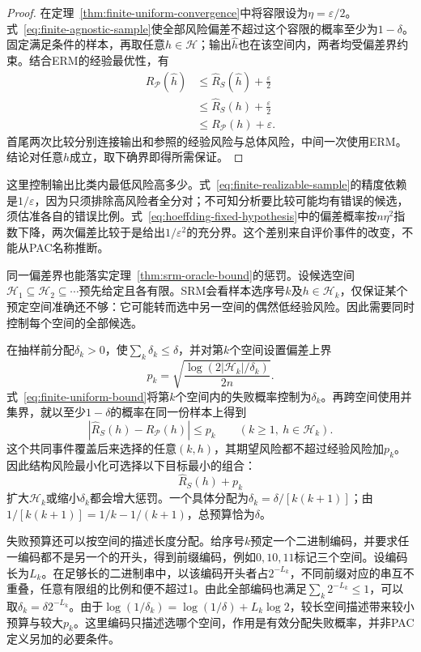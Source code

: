 \begin{proof}
在定理~\ref{thm:finite-uniform-convergence}中将容限设为$\eta=\varepsilon/2$。式~\eqref{eq:finite-agnostic-sample}使全部风险偏差不超过这个容限的概率至少为$1-\delta$。固定满足条件的样本，再取任意$h\in\mathcal H$；输出$\hat h$也在该空间内，两者均受偏差界约束。结合ERM的经验最优性，有
\begin{align*}
 R_{\mathcal P}(\hat h)
 &\leq\hat R_S(\hat h)+\frac{\varepsilon}{2}\\
 &\leq\hat R_S(h)+\frac{\varepsilon}{2}\\
 &\leq R_{\mathcal P}(h)+\varepsilon.
\end{align*}
首尾两次比较分别连接输出和参照的经验风险与总体风险，中间一次使用ERM。结论对任意$h$成立，取下确界即得所需保证。
\end{proof}

这里控制输出比类内最低风险高多少。式~\eqref{eq:finite-realizable-sample}的精度依赖是$1/\varepsilon$，因为只须排除高风险者全分对；不可知分析要比较可能均有错误的候选，须估准各自的错误比例。式~\eqref{eq:hoeffding-fixed-hypothesis}中的偏差概率按$n\eta^2$指数下降，两次偏差比较于是给出$1/\varepsilon^2$的充分界。这个差别来自评价事件的改变，不能从PAC名称推断。

同一偏差界也能落实定理~\ref{thm:srm-oracle-bound}的惩罚。设候选空间$\mathcal H_1\subseteq\mathcal H_2\subseteq\cdots$预先给定且各有限。SRM会看样本选序号$k$及$h\in\mathcal H_k$，仅保证某个预定空间准确还不够：它可能转而选中另一空间的偶然低经验风险。因此需要同时控制每个空间的全部候选。

在抽样前分配$\delta_k>0$，使$\sum_k\delta_k\leq\delta$，并对第$k$个空间设置偏差上界
\[
 p_k=\sqrt{\frac{\log(2|\mathcal H_k|/\delta_k)}{2n}}.
\]
式~\eqref{eq:finite-uniform-bound}将第$k$个空间内的失败概率控制为$\delta_k$。再跨空间使用并集界，就以至少$1-\delta$的概率在同一份样本上得到
\[
 |\hat R_S(h)-R_{\mathcal P}(h)|\leq p_k
 \qquad(k\geq1,\ h\in\mathcal H_k).
\]
这个共同事件覆盖后来选择的任意$(k,h)$，其期望风险都不超过经验风险加$p_k$。因此结构风险最小化可选择以下目标最小的组合：
\begin{equation}
 \hat R_S(h)+p_k
 \label{eq:srm-finite-penalty}
\end{equation}
扩大$\mathcal H_k$或缩小$\delta_k$都会增大惩罚。一个具体分配为$\delta_k=\delta/[k(k+1)]$；由$1/[k(k+1)]=1/k-1/(k+1)$，总预算恰为$\delta$。

失败预算还可以按空间的描述长度分配。给序号$k$预定一个二进制编码，并要求任一编码都不是另一个的开头，得到前缀编码，例如$0,10,11$标记三个空间。设编码长为$L_k$。在足够长的二进制串中，以该编码开头者占$2^{-L_k}$，不同前缀对应的串互不重叠，任意有限组的比例和便不超过1。由此全部编码也满足$\sum_k2^{-L_k}\leq1$，可以取$\delta_k=\delta2^{-L_k}$。由于$\log(1/\delta_k)=\log(1/\delta)+L_k\log2$，较长空间描述带来较小预算与较大$p_k$。这里编码只描述选哪个空间，作用是有效分配失败概率，并非PAC定义另加的必要条件。

